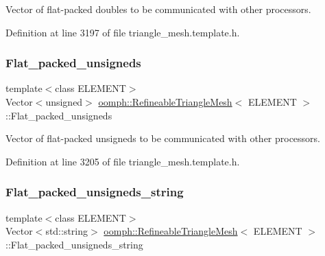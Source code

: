 Vector of flat-\/packed doubles to be communicated with other processors. 



Definition at line 3197 of file triangle\+\_\+mesh.\+template.\+h.

\mbox{\label{classoomph_1_1RefineableTriangleMesh_a162fd7e805e4899cf4590cb5245849f2}} 
\subsubsection{\texorpdfstring{Flat\+\_\+packed\+\_\+unsigneds}{Flat\_packed\_unsigneds}}
{\footnotesize\ttfamily template$<$class E\+L\+E\+M\+E\+NT$>$ \\
Vector$<$unsigned$>$ \hyperlink{classoomph_1_1RefineableTriangleMesh}{oomph\+::\+Refineable\+Triangle\+Mesh}$<$ E\+L\+E\+M\+E\+NT $>$\+::Flat\+\_\+packed\+\_\+unsigneds\hspace{0.3cm}{\ttfamily [protected]}}



Vector of flat-\/packed unsigneds to be communicated with other processors. 



Definition at line 3205 of file triangle\+\_\+mesh.\+template.\+h.

\mbox{\label{classoomph_1_1RefineableTriangleMesh_aff72d905fab5ad211c1f7d4b77d24149}} 
\subsubsection{\texorpdfstring{Flat\+\_\+packed\+\_\+unsigneds\+\_\+string}{Flat\_packed\_unsigneds\_string}}
{\footnotesize\ttfamily template$<$class E\+L\+E\+M\+E\+NT$>$ \\
Vector$<$std\+::string$>$ \hyperlink{classoomph_1_1RefineableTriangleMesh}{oomph\+::\+Refineable\+Triangle\+Mesh}$<$ E\+L\+E\+M\+E\+NT $>$\+::Flat\+\_\+packed\+\_\+unsigneds\+\_\+string\hspace{0.3cm}{\ttfamily [protected]}}



